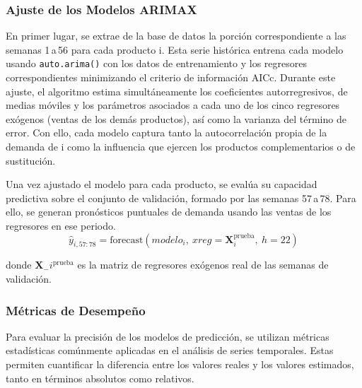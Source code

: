 \documentclass[12pt]{article}
\begin{document}
\vspace{0.5cm}
\subsubsection{Ajuste de los Modelos ARIMAX}
En primer lugar, se extrae de la base de datos la porción correspondiente a las semanas 1 a 56 para cada producto i. Esta serie histórica entrena cada modelo usando \verb|auto.arima()| con los datos de entrenamiento y los regresores correspondientes minimizando el criterio de información AICc. Durante este ajuste, el algoritmo estima simultáneamente los coeficientes autorregresivos, de medias móviles y los parámetros asociados a cada uno de los cinco regresores exógenos (ventas de los demás productos), así como la varianza del término de error. Con ello, cada modelo captura tanto la autocorrelación propia de la demanda de i como la influencia que ejercen los productos complementarios o de sustitución.
\vspace{0.3cm}

Una vez ajustado el modelo para cada producto, se evalúa su capacidad predictiva sobre el conjunto de validación, formado por las semanas 57 a 78. Para ello, se generan pronósticos puntuales de demanda usando las ventas de los regresores en ese periodo.  
\vspace{0.3cm}
\begin{equation}
\hat{y}_{i,57:78} = \text{forecast}(modelo_i, \ xreg = \mathbf{X}_i^{\text{prueba}}, \ h = 22)
\end{equation}

donde $\mathbf{X}_-i^{\text{prueba}}$ es la matriz de regresores exógenos real de las semanas de validación.

\vspace{0.5cm}
\subsubsection{Métricas de Desempeño}

Para evaluar la precisión de los modelos de predicción, se utilizan métricas estadísticas comúnmente aplicadas en el análisis de series temporales. Estas permiten cuantificar la diferencia entre los valores reales y los valores estimados, tanto en términos absolutos como relativos. 
\end{document}
